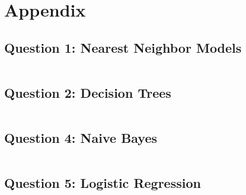 \documentclass{article} %
\begin{document}
\section*{Appendix}
\subsection*{Question 1: Nearest Neighbor Models}
\inputminted{python}{code/knn.py}
\subsection*{Question 2: Decision Trees}
\inputminted{python}{code/descision_tree.py}
\subsection*{Question 4: Naive Bayes}
\inputminted{python}{code/naive_bayes.py}
\subsection*{Question 5: Logistic Regression}
\inputminted{python}{code/logistic.py}
\end{document}

